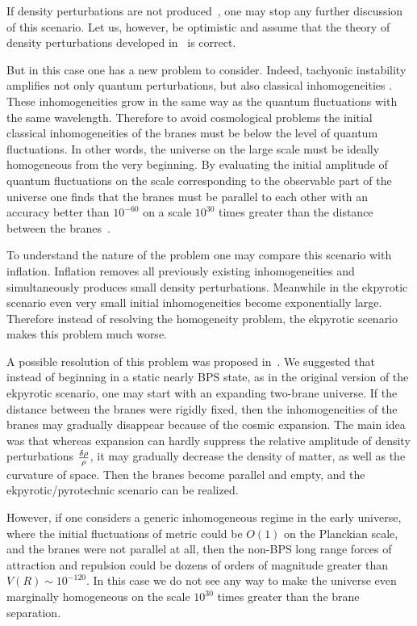 \documentclass[a4paper,12pt]{article}
\begin{document}
If density perturbations are not produced~\cite{Lyth:2001pf}, one may stop any further discussion of this scenario. Let us, however, be optimistic and assume that the theory of density perturbations developed in~\cite{KOST,KKL} is correct.

But in this case one has a new problem to consider. Indeed, tachyonic instability amplifies not only quantum perturbations, but also classical inhomogeneities \cite{KKL}. These inhomogeneities grow in the same way as the quantum fluctuations with the same wavelength. Therefore to avoid cosmological problems the initial classical inhomogeneities of the branes must be below the level of quantum fluctuations. In other words, the universe on the large scale must be ideally homogeneous from the very beginning. By evaluating the initial amplitude of quantum fluctuations on the scale corresponding to the observable part of the universe one finds that the branes must be parallel to each other with an accuracy better than
$10^{-60}$ on a scale $10^{30}$ times greater than the distance between
the branes~\cite{KKL}. 

To understand the nature of  the problem  one may compare this scenario
with inflation. Inflation removes all previously existing inhomogeneities  and simultaneously produces small density perturbations.  Meanwhile in the ekpyrotic scenario even very small initial inhomogeneities become exponentially large. Therefore instead of resolving the homogeneity problem, the ekpyrotic scenario makes this problem much worse. 



A possible resolution of this problem was proposed in~\cite{KKL}. We suggested that instead of beginning in a static nearly BPS state, as in the original version of the ekpyrotic scenario, one may start with an expanding two-brane universe. If the distance between the branes were rigidly fixed, then the inhomogeneities of the branes may gradually disappear because of the cosmic expansion. The main idea was that whereas expansion can hardly suppress the relative amplitude of density perturbations ${\delta\rho\over \rho}$, it may gradually decrease the density of matter, as well as the curvature of space. Then the branes become parallel and empty, and the ekpyrotic/pyrotechnic scenario can be realized.

However,  if one considers a generic inhomogeneous regime in the early
universe, where the initial fluctuations of metric could be $O(1)$ on the
Planckian scale, and the branes were not parallel at all, then  the
non-BPS long range forces of attraction and repulsion could be dozens of
orders of magnitude greater than  $V(R)\sim 10^{-120}$. In this case we do
not see any way to make the universe even marginally homogeneous on the
scale $10^{30}$ times greater than the brane separation.
\end{document}
